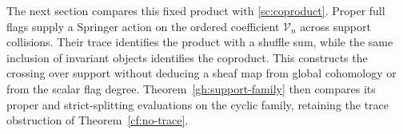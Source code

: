The next section compares this fixed product with
\eqref{sc:coproduct}. Proper full flags supply a Springer action
on the ordered coefficient $\mathcal V_n$ across support
collisions. Their trace identifies the product with a shuffle
sum, while the same inclusion of invariant objects identifies
the coproduct. This constructs the crossing over support without
deducing a sheaf map from global cohomology or from the scalar
flag degree. Theorem~\ref{gh:support-family} then compares its
proper and strict-splitting evaluations on the cyclic family,
retaining the trace obstruction of Theorem~\ref{cf:no-trace}.
